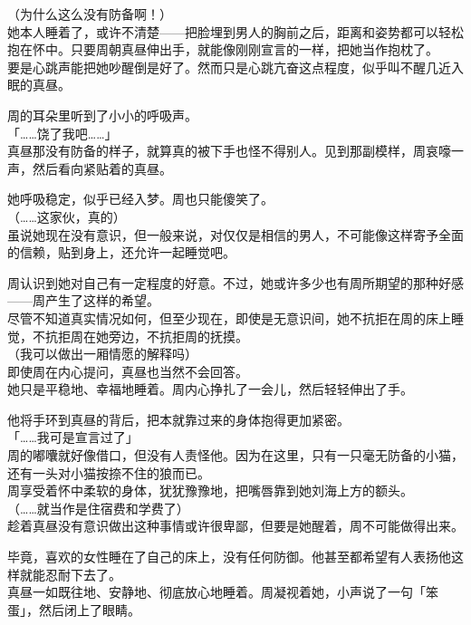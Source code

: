 （为什么这么没有防备啊！）\\

她本人睡着了，或许不清楚——把脸埋到男人的胸前之后，距离和姿势都可以轻松抱在怀中。只要周朝真昼伸出手，就能像刚刚宣言的一样，把她当作抱枕了。\\

要是心跳声能把她吵醒倒是好了。然而只是心跳亢奋这点程度，似乎叫不醒几近入眠的真昼。

周的耳朵里听到了小小的呼吸声。\\

「……饶了我吧……」\\

真昼那没有防备的样子，就算真的被下手也怪不得别人。见到那副模样，周哀嚎一声，然后看向紧贴着的真昼。

她呼吸稳定，似乎已经入梦。周也只能傻笑了。\\

（……这家伙，真的）\\

虽说她现在没有意识，但一般来说，对仅仅是相信的男人，不可能像这样寄予全面的信赖，贴到身上，还允许一起睡觉吧。

周认识到她对自己有一定程度的好意。不过，她或许多少也有周所期望的那种好感——周产生了这样的希望。\\

尽管不知道真实情况如何，但至少现在，即使是无意识间，她不抗拒在周的床上睡觉，不抗拒周在她旁边，不抗拒周的抚摸。\\

（我可以做出一厢情愿的解释吗）\\

即使周在内心提问，真昼也当然不会回答。\\

她只是平稳地、幸福地睡着。周内心挣扎了一会儿，然后轻轻伸出了手。

他将手环到真昼的背后，把本就靠过来的身体抱得更加紧密。\\

「……我可是宣言过了」\\

周的嘟囔就好像借口，但没有人责怪他。因为在这里，只有一只毫无防备的小猫，还有一头对小猫按捺不住的狼而已。\\

周享受着怀中柔软的身体，犹犹豫豫地，把嘴唇靠到她刘海上方的额头。\\

（……就当作是住宿费和学费了）\\

趁着真昼没有意识做出这种事情或许很卑鄙，但要是她醒着，周不可能做得出来。

毕竟，喜欢的女性睡在了自己的床上，没有任何防御。他甚至都希望有人表扬他这样就能忍耐下去了。\\

真昼一如既往地、安静地、彻底放心地睡着。周凝视着她，小声说了一句「笨蛋」，然后闭上了眼睛。
